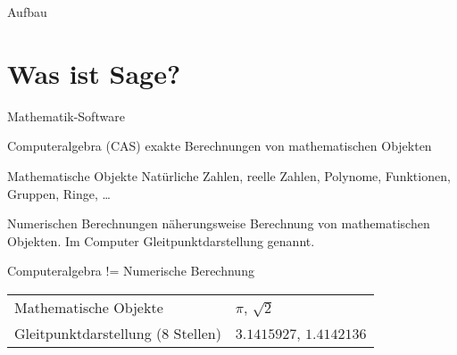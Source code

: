 \documentclass[hyperref={xetex}]{beamer}
\begin{document}
\begin{frame}{Aufbau}
\tableofcontents
\end{frame}



\section{Was ist Sage?}

\begin{frame}{Mathematik-Software}

\begin{block}{Computeralgebra (CAS)}
\alert{exakte} Berechnungen von mathematischen Objekten
\end{block}
\bigskip

\begin{block}{Mathematische Objekte} 
Natürliche Zahlen, reelle Zahlen, Polynome, Funktionen,
Gruppen, Ringe, \ldots
\end{block}

\begin{block}{Numerischen Berechnungen}
\alert{näherungsweise} Berechnung von mathematischen Objekten. Im Computer 
{\color{blue}Gleitpunktdarstellung} genannt.
\end{block}


\begin{block}{Computeralgebra != Numerische Berechnung}
\begin{tabular}{ll}
 Mathematische Objekte & $\pi$, $\sqrt{2}$\\
 Gleitpunktdarstellung (8 Stellen)& $3.1415927$, $1.4142136$
\end{tabular}
\end{block}
\end{frame}
\end{document}
